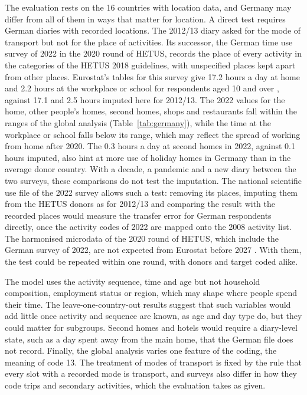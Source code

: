 \documentclass[a4paper]{article}
\begin{document}
The evaluation rests on the 16 countries with location data, and Germany may differ from all of them in ways that matter for location. A direct test requires German diaries with recorded locations. The 2012/13 diary asked for the mode of transport but not for the place of activities. Its successor, the German time use survey of 2022 in the 2020 round of HETUS, records the place of every activity in the categories of the HETUS 2018 guidelines, with unspecified places kept apart from other places. Eurostat's tables for this survey give 17.2 hours a day at home and 2.2 hours at the workplace or school for respondents aged 10 and over \parencite{eurostatTimeSpentMain2026}, against 17.1 and 2.5 hours imputed here for 2012/13. The 2022 values for the home, other people's homes, second homes, shops and restaurants fall within the ranges of the global analysis (Table~\ref{tab:germany}), while the time at the workplace or school falls below its range, which may reflect the spread of working from home after 2020. The 0.3 hours a day at second homes in 2022, against 0.1 hours imputed, also hint at more use of holiday homes in Germany than in the average donor country. With a decade, a pandemic and a new diary between the two surveys, these comparisons do not test the imputation. The national scientific use file of the 2022 survey \parencite{fdzZeitverwendungserhebung2022} allows such a test: removing its places, imputing them from the HETUS donors as for 2012/13 and comparing the result with the recorded places would measure the transfer error for German respondents directly, once the activity codes of 2022 are mapped onto the 2008 activity list. The harmonised microdata of the 2020 round of HETUS, which include the German survey of 2022, are not expected from Eurostat before 2027 \parencite{eurostatHETUSMicrodata2026}. With them, the test could be repeated within one round, with donors and target coded alike.

The model uses the activity sequence, time and age but not household composition, employment status or region, which may shape where people spend their time. The leave-one-country-out results suggest that such variables would add little once activity and sequence are known, as age and day type do, but they could matter for subgroups. Second homes and hotels would require a diary-level state, such as a day spent away from the main home, that the German file does not record. Finally, the global analysis varies one feature of the coding, the meaning of code 13. The treatment of modes of transport is fixed by the rule that every slot with a recorded mode is transport, and surveys also differ in how they code trips and secondary activities, which the evaluation takes as given.
\end{document}
